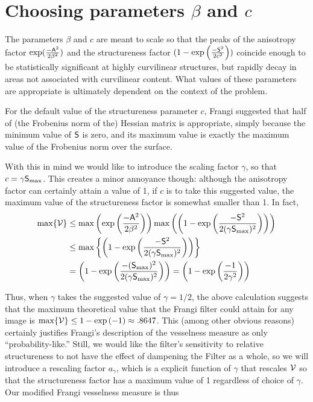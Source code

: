 \section{Choosing parameters $\beta$ and $c$}

The parameters $\beta$ and $c$ are meant to scale so that the peaks of the anisotropy factor $\exp(\frac{-\mathsf{A}^2}{2\beta^2})$ and the structureness factor $(1-\exp\left(\frac{-\mathsf{S}^2}{2c^2}\right))$ coincide enough to be statistically significant at highly curvilinear structures, but rapidly decay in areas not associated with curvilinear content. What values of these parameters are appropriate is ultimately dependent on the context of the problem.

For the default value of the structureness parameter $c$, Frangi suggested that half of (the Frobenius norm of the) Hessian matrix is appropriate, simply because the minimum value of $\mathsf{S}$ is zero, and its maximum value is exactly the maximum value of the Frobenius norm over the surface.

With this in mind we would like to introduce the scaling factor $\gamma$, so that $ c = \gamma \mathsf{S}_{\max}$. This creates a minor annoyance though: although the anisotropy factor can certainly attain a value of 1, if $c$ is to take this suggested value, the maximum value of the structureness factor is somewhat smaller than 1. In fact,
\begin{equation}
\begin{aligned}
\max\{\mathcal{V} \} &\le \max\left(
\exp\left(\frac{-\mathsf{A}^2}{2\beta^2}\right)
\right)
\max\left(
\left(1 - \exp\left(\frac{-\mathsf{S}^2}{2(\gamma \mathsf{S}_{\max})^2}\right)\right)
\right) \\
&\le \max\left\{
\left(1 - \exp\left(\frac{-\mathsf{S}^2}{2(\gamma \mathsf{S}_{\max})^2}\right)\right)
\right\} \\
&= 
\left(1 - \exp\left(\frac{-(\mathsf{S}_{\max})^2}{2(\gamma \mathsf{S}_{\max})^2}\right)
\right)
= \left(1 - \exp\left(\frac{-1}{2\gamma^2}\right)
\right)
\end{aligned}
\end{equation}

Thus, when $\gamma$ takes the suggested value of $\gamma = 1/2$, the above calculation suggests that
the maximum theoretical value that the Frangi filter could attain for any image is
$ \max \{ \mathcal{V} \} \le 1 - \exp\left( -1 \right) \approx .8647$.
This (among other obvious reasons) certainly justifies Frangi's description of the vesselness measure as only ``probability-like.'' Still, we would like the filter's sensitivity to relative structureness to not have the effect of dampening the Filter as a whole, so we will introduce a rescaling factor $a_\gamma$, which is a explicit function of $\gamma$ that rescales $\mathcal{V}$ so that the structureness factor has a maximum value of 1 regardless of choice of $\gamma$. Our modified Frangi vesselness measure is thus

